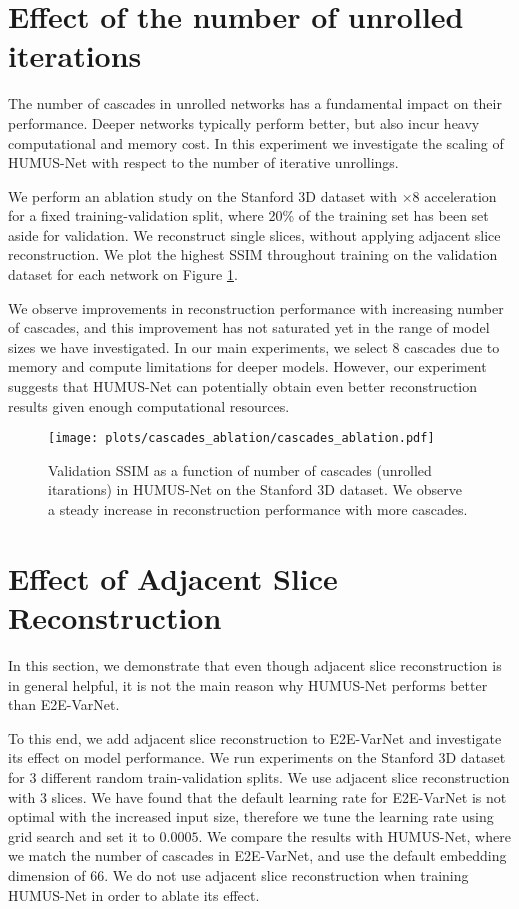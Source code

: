 \section{Effect of the number of unrolled iterations\label{sec:apx_unrolled_num}}
The number of cascades in unrolled networks has a fundamental impact on their performance. Deeper networks typically perform better, but also incur heavy computational and memory cost.
In this experiment we investigate the scaling of HUMUS-Net with respect to the number of iterative unrollings. 

We perform an ablation study on the Stanford 3D dataset with $\times8$ acceleration for a fixed training-validation split, where 20\% of the training set has been set aside for validation. We reconstruct single slices, without applying adjacent slice reconstruction. We plot the highest SSIM throughout training on the validation dataset for each network on Figure \ref{fig:apx_casc_abl}. 

We observe improvements in reconstruction performance with increasing number of cascades, and this improvement has not saturated yet in the range of model sizes we have investigated. In our main experiments, we select 8 cascades due to memory and compute limitations for deeper models. However, our experiment suggests that HUMUS-Net can potentially obtain even better reconstruction results given enough computational resources.

\begin{figure}[t!]
	\centering
	\hspace{-1cm}
	\texttt{[image: plots/cascades\_ablation/cascades\_ablation.pdf]}	
	\caption{Validation SSIM as a function of number of cascades (unrolled itarations) in HUMUS-Net on the Stanford 3D dataset. We observe a steady increase in reconstruction performance with more cascades. \label{fig:apx_casc_abl}}
\end{figure}

\section{Effect of Adjacent Slice Reconstruction\label{sec:apx_asr}}
In this section, we demonstrate that even though adjacent slice reconstruction is in general helpful, it is not the main reason why HUMUS-Net performs better than E2E-VarNet.

To this end, we add  adjacent slice reconstruction to E2E-VarNet and investigate its effect on model performance. We run experiments on the Stanford 3D dataset for $3$ different random train-validation splits. We use adjacent slice reconstruction with $3$ slices. We have found that the default learning rate for E2E-VarNet is not optimal with the increased input size, therefore we tune the learning rate using grid search and set it to $0.0005$. We compare the results with HUMUS-Net, where we match the number of cascades in E2E-VarNet, and use the default embedding dimension of $66$. We do not use adjacent slice reconstruction when training HUMUS-Net in order to ablate its effect.

